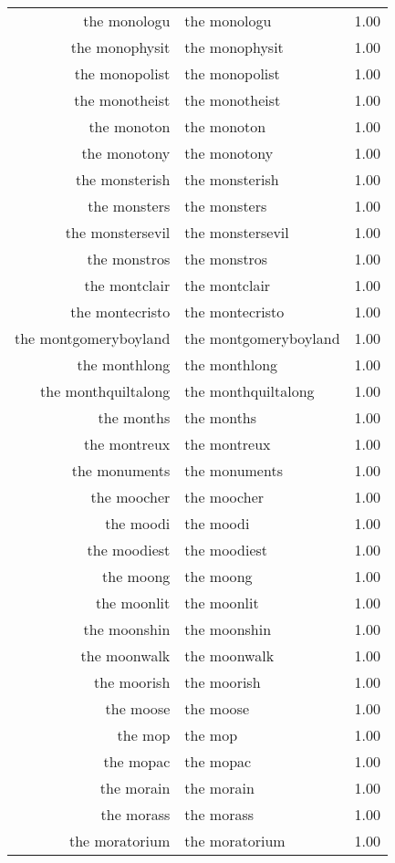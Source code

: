 \begin{table}[ht]
\begin{tabular}{rlr}
  the monologu & the monologu & 1.00 \\ 
  the monophysit & the monophysit & 1.00 \\ 
  the monopolist & the monopolist & 1.00 \\ 
  the monotheist & the monotheist & 1.00 \\ 
  the monoton & the monoton & 1.00 \\ 
  the monotony & the monotony & 1.00 \\ 
  the monsterish & the monsterish & 1.00 \\ 
  the monsters & the monsters & 1.00 \\ 
  the monstersevil & the monstersevil & 1.00 \\ 
  the monstros & the monstros & 1.00 \\ 
  the montclair & the montclair & 1.00 \\ 
  the montecristo & the montecristo & 1.00 \\ 
  the montgomeryboyland & the montgomeryboyland & 1.00 \\ 
  the monthlong & the monthlong & 1.00 \\ 
  the monthquiltalong & the monthquiltalong & 1.00 \\ 
  the months & the months & 1.00 \\ 
  the montreux & the montreux & 1.00 \\ 
  the monuments & the monuments & 1.00 \\ 
  the moocher & the moocher & 1.00 \\ 
  the moodi & the moodi & 1.00 \\ 
  the moodiest & the moodiest & 1.00 \\ 
  the moong & the moong & 1.00 \\ 
  the moonlit & the moonlit & 1.00 \\ 
  the moonshin & the moonshin & 1.00 \\ 
  the moonwalk & the moonwalk & 1.00 \\ 
  the moorish & the moorish & 1.00 \\ 
  the moose & the moose & 1.00 \\ 
  the mop & the mop & 1.00 \\ 
  the mopac & the mopac & 1.00 \\ 
  the morain & the morain & 1.00 \\ 
  the morass & the morass & 1.00 \\ 
  the moratorium & the moratorium & 1.00 \\ 

\end{tabular}
\end{table}
